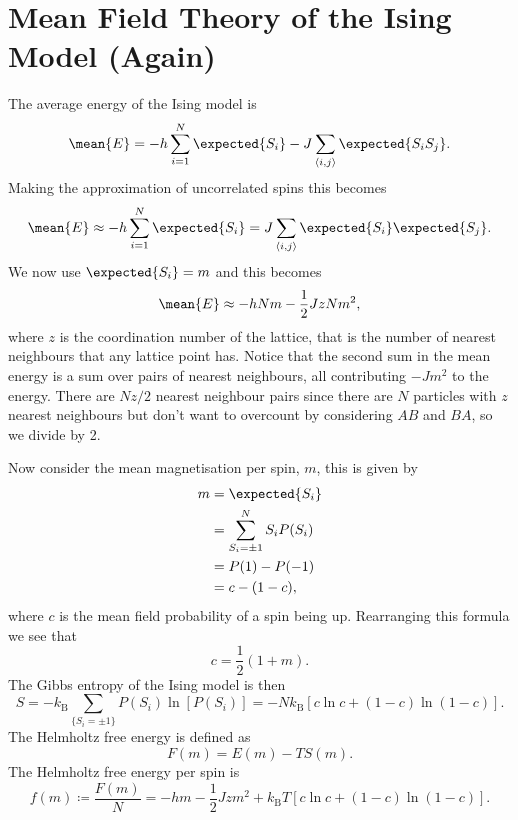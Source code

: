 \documentclass[fleqn]{NotesClass}
\newcommand*{\boltzmann}{k_{\mathrm{B}}}
\begin{document}
    \section{Mean Field Theory of the Ising Model (Again)}
    The average energy of the Ising model is
    \begin{equation}
        \mean{E} = -h\sum_{i = 1}^{N}\expected{S_i} - J\sum_{\langle i, j \rangle} \expected{S_iS_j}.
    \end{equation}
    Making the approximation of uncorrelated spins this becomes
    \begin{equation}
        \mean{E} \approx -h\sum_{i = 1}^{N} \expected{S_i} = J\sum_{\langle i, j \rangle} \expected{S_i}\expected{S_j}.
    \end{equation}
    We now use \(\expected{S_i} = m\) and this becomes
    \begin{equation}
        \mean{E} \approx -hNm - \frac{1}{2}JzNm^2,
    \end{equation}
    where \(z\) is the coordination number of the lattice, that is the number of nearest neighbours that any lattice point has.
    Notice that the second sum in the mean energy is a sum over pairs of nearest neighbours, all contributing \(-Jm^2\) to the energy.
    There are \(Nz/2\) nearest neighbour pairs since there are \(N\) particles with \(z\) nearest neighbours but don't want to overcount by considering \(AB\) and \(BA\), so we divide by 2.
    
    Now consider the mean magnetisation per spin, \(m\), this is given by
    \begin{align}
        m &= \expected{S_i}\\
        &= \sum_{S_i = \pm 1}^{N} S_iP(S_i)\\
        &= P(1) - P(-1)\\
        &= c - (1 - c),
    \end{align}
    where \(c\) is the mean field probability of a spin being up.
    Rearranging this formula we see that
    \begin{equation}
        c = \frac{1}{2}(1 + m).
    \end{equation}
    The Gibbs entropy of the Ising model is then
    \begin{equation}
        S = -\boltzmann\sum_{\{S_i = \pm 1\}}P(S_i)\ln[P(S_i)] = -N\boltzmann[c\ln c + (1 - c)\ln(1 - c)].
    \end{equation}
    The Helmholtz free energy is defined as
    \begin{equation}
        F(m) = E(m) - TS(m).
    \end{equation}
    The Helmholtz free energy per spin is
    \begin{equation}
        f(m) \coloneqq \frac{F(m)}{N} = -hm - \frac{1}{2}Jzm^2 + \boltzmann T[c\ln c + (1 - c)\ln(1 - c)].
    \end{equation}
    
\end{document}
